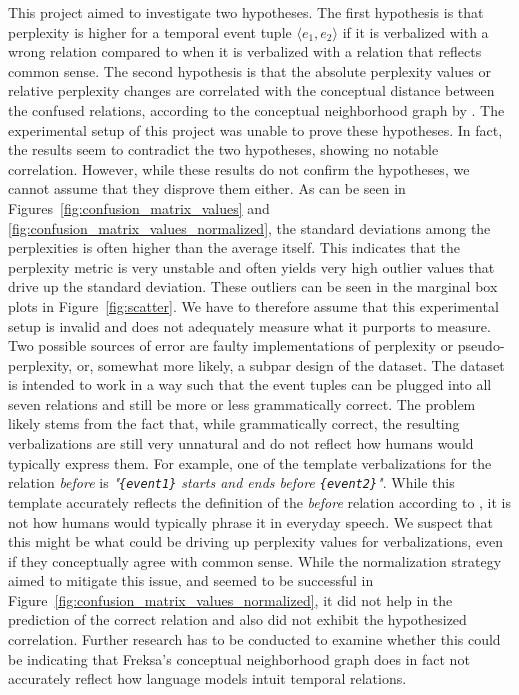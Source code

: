 \documentclass[11pt]{article}
\begin{document}
This project aimed to investigate two hypotheses. The first hypothesis is that perplexity is higher for a temporal event tuple $\langle e_1, e_2 \rangle$ if it is verbalized with a wrong relation compared to when it is verbalized with a relation that reflects common sense. The second hypothesis is that the absolute perplexity values or relative perplexity changes are correlated with the conceptual distance between the confused relations, according to the conceptual neighborhood graph by \citet{freksa}. The experimental setup of this project was unable to prove these hypotheses. In fact, the results seem to contradict the two hypotheses, showing no notable correlation. However, while these results do not confirm the hypotheses, we cannot assume that they disprove them either. As can be seen in Figures~\ref{fig:confusion_matrix_values} and \ref{fig:confusion_matrix_values_normalized}, the standard deviations among the perplexities is often higher than the average itself. This indicates that the perplexity metric is very unstable and often yields very high outlier values that drive up the standard deviation. These outliers can be seen in the marginal box plots in Figure~\ref{fig:scatter}. We have to therefore assume that this experimental setup is invalid and does not adequately measure what it purports to measure. Two possible sources of error are faulty implementations of perplexity or pseudo-perplexity, or, somewhat more likely, a subpar design of the dataset. The dataset is intended to work in a way such that the event tuples can be plugged into all seven relations and still be more or less grammatically correct. The problem likely stems from the fact that, while grammatically correct, the resulting verbalizations are still very unnatural and do not reflect how humans would typically express them. For example, one of the template verbalizations for the relation \textit{before} is \textit{"\texttt{\{event1\}} starts and ends before \texttt{\{event2\}}"}. While this template accurately reflects the definition of the \textit{before} relation according to \citet{allen}, it is not how humans would typically phrase it in everyday speech. We suspect that this might be what could be driving up perplexity values for verbalizations, even if they conceptually agree with common sense. While the normalization strategy aimed to mitigate this issue, and seemed to be successful in Figure~\ref{fig:confusion_matrix_values_normalized}, it did not help in the prediction of the correct relation and also did not exhibit the hypothesized correlation. Further research has to be conducted to examine whether this could be indicating that Freksa's conceptual neighborhood graph does in fact not accurately reflect how language models intuit temporal relations.
\end{document}
